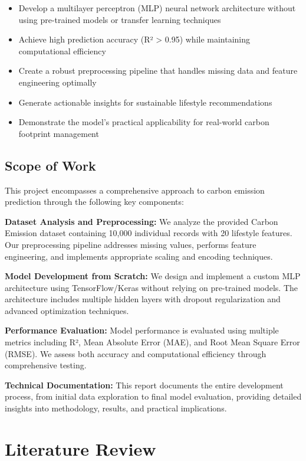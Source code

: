 \documentclass[12pt,a4paper]{article}
\begin{document}
\begin{itemize}
    \item Develop a multilayer perceptron (MLP) neural network architecture without using pre-trained models or transfer learning techniques
    \item Achieve high prediction accuracy (R² > 0.95) while maintaining computational efficiency
    \item Create a robust preprocessing pipeline that handles missing data and feature engineering optimally
    \item Generate actionable insights for sustainable lifestyle recommendations
    \item Demonstrate the model's practical applicability for real-world carbon footprint management
\end{itemize}

\subsection{Scope of Work}

This project encompasses a comprehensive approach to carbon emission prediction through the following key components:

\textbf{Dataset Analysis and Preprocessing:} We analyze the provided Carbon Emission dataset containing 10,000 individual records with 20 lifestyle features. Our preprocessing pipeline addresses missing values, performs feature engineering, and implements appropriate scaling and encoding techniques.

\textbf{Model Development from Scratch:} We design and implement a custom MLP architecture using TensorFlow/Keras without relying on pre-trained models. The architecture includes multiple hidden layers with dropout regularization and advanced optimization techniques.

\textbf{Performance Evaluation:} Model performance is evaluated using multiple metrics including R², Mean Absolute Error (MAE), and Root Mean Square Error (RMSE). We assess both accuracy and computational efficiency through comprehensive testing.

\textbf{Technical Documentation:} This report documents the entire development process, from initial data exploration to final model evaluation, providing detailed insights into methodology, results, and practical implications.

\section{Literature Review}
\end{document}
